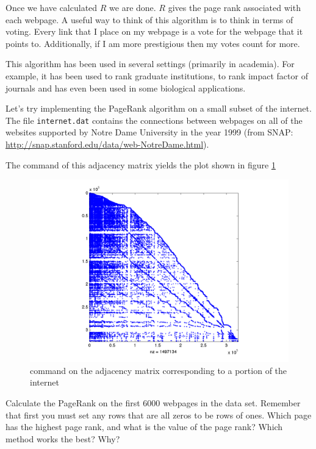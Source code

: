 Once we have calculated $R$ we are done.
$R$ gives the page rank associated with each webpage.
A useful way to think of this algorithm is to think in terms of voting.
Every link that I place on my webpage is a vote for the webpage that it points to.
Additionally, if I am more prestigious then my votes count for more.

This algorithm has been used in several settings (primarily in academia).
For example, it has been used to rank graduate institutions, to rank impact factor of journals and has even been used in some biological applications.

Let's try implementing the PageRank algorithm on a small subset of the internet.
The file \texttt{internet.dat} contains the connections between webpages on all of the websites supported by Notre Dame University in the year 1999 (from SNAP: \url{http://snap.stanford.edu/data/web-NotreDame.html}).

The  command of this adjacency matrix yields the plot shown in figure \ref{Fig:WebSparse}


\begin{figure}
\begin{center}
\includegraphics[scale = .4]{WebSparse.pdf}
\caption{ command on the adjacency matrix corresponding to a portion of the internet}
\label{Fig:WebSparse}
\end{center}
\end{figure}

\begin{problem}
\label{prob:pg_calc}
Calculate the PageRank on the first 6000 webpages in the data set.
Remember that first you must set any rows that are all zeros to be rows of ones.
Which page has the highest page rank, and what is the value of the page rank?
Which method works the best?
Why?
\end{problem}

